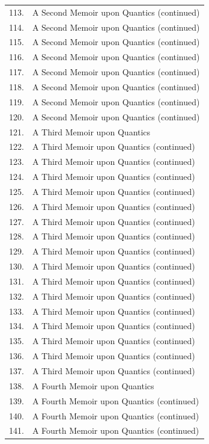 \documentclass[11pt,a4paper]{article}
\begin{document}
\begin{longtable}{rp{}}
113. & A Second Memoir upon Quantics (continued) \\
114. & A Second Memoir upon Quantics (continued) \\
115. & A Second Memoir upon Quantics (continued) \\
116. & A Second Memoir upon Quantics (continued) \\
117. & A Second Memoir upon Quantics (continued) \\
118. & A Second Memoir upon Quantics (continued) \\
119. & A Second Memoir upon Quantics (continued) \\
120. & A Second Memoir upon Quantics (continued) \\
121. & A Third Memoir upon Quantics \\
122. & A Third Memoir upon Quantics (continued) \\
123. & A Third Memoir upon Quantics (continued) \\
124. & A Third Memoir upon Quantics (continued) \\
125. & A Third Memoir upon Quantics (continued) \\
126. & A Third Memoir upon Quantics (continued) \\
127. & A Third Memoir upon Quantics (continued) \\
128. & A Third Memoir upon Quantics (continued) \\
129. & A Third Memoir upon Quantics (continued) \\
130. & A Third Memoir upon Quantics (continued) \\
131. & A Third Memoir upon Quantics (continued) \\
132. & A Third Memoir upon Quantics (continued) \\
133. & A Third Memoir upon Quantics (continued) \\
134. & A Third Memoir upon Quantics (continued) \\
135. & A Third Memoir upon Quantics (continued) \\
136. & A Third Memoir upon Quantics (continued) \\
137. & A Third Memoir upon Quantics (continued) \\
138. & A Fourth Memoir upon Quantics \\
139. & A Fourth Memoir upon Quantics (continued) \\
140. & A Fourth Memoir upon Quantics (continued) \\
141. & A Fourth Memoir upon Quantics (continued) \\

\end{longtable}
\end{document}
